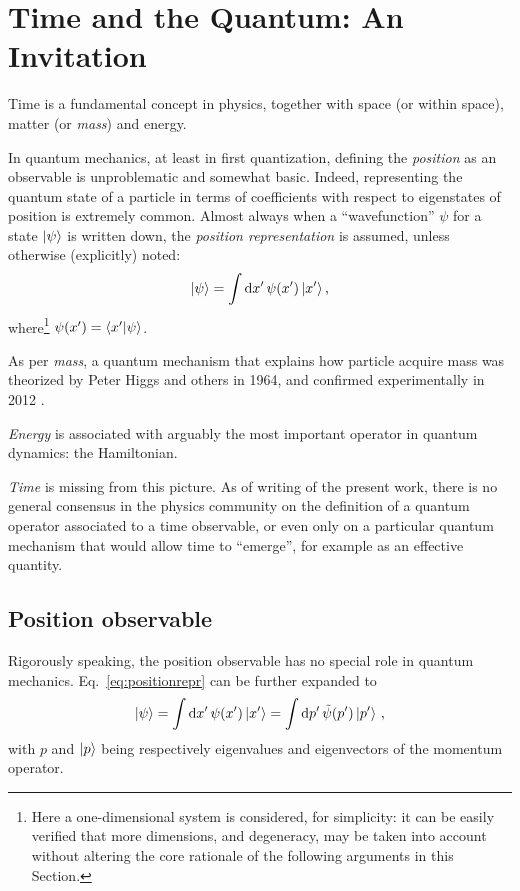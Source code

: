 \section{Time and the Quantum: An Invitation}\label{sec:intro}

Time is a fundamental concept in physics, together with space (or  within space),
matter (or \emph{mass}) and energy.

In quantum mechanics, at least in first quantization, defining the \emph{position} as
an observable is unproblematic and somewhat basic.
Indeed, representing the quantum state of a particle
in terms of coefficients with respect to eigenstates of position is extremely common.
Almost always when a ``wavefunction'' $\psi$
for a state $\ket{\psi}$
is written down, the \emph{position representation}
is assumed, unless otherwise (explicitly) noted:
\begin{equation}\label{eq:positionrepr}
  \ket{\psi} = \int \dd{x'} \psi(x') \ket{x'} \text{,}
\end{equation}
where\footnote{
  Here a one-dimensional system is considered, for simplicity:
  it can be easily verified that more dimensions,
  and degeneracy, may be taken into account without altering the core rationale of the
  following arguments in this Section.
}
$\psi(x') = \braket{x'}{\psi}$.

As per \emph{mass}, a quantum mechanism that explains how particle acquire mass was theorized by
Peter Higgs and others in 1964, and confirmed experimentally in 2012
\parencite{Higgs, EnglertBrout, Kibble+, HiggsATLAS, HiggsCMS}.

\emph{Energy} is associated with arguably the most important operator in quantum dynamics: the Hamiltonian.

\emph{Time} is missing from this picture. As of writing of the present work,
there is no general consensus in the physics community on
the definition of a quantum operator associated to a time observable,
or even only on a particular quantum mechanism that would allow time to ``emerge'',
for example as an effective quantity.

\subsection{Position observable}

Rigorously speaking, the position observable has no special role in quantum mechanics.
Eq.~\eqref{eq:positionrepr} can be further expanded to
\begin{equation}\label{eq:qprepr}
  \ket{\psi} = \int \dd{x'} \psi(x') \ket{x'} = \int \dd{p'} \tilde{\psi}(p') \ket{p'} \,\text{,}
\end{equation}
with $p$ and $\ket{p}$ being respectively eigenvalues and eigenvectors of the momentum operator.

